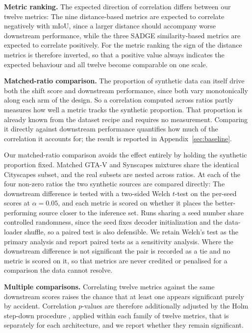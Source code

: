\documentclass[conference]{IEEEtran}
\begin{document}
\textbf{Metric ranking.} The expected direction of correlation differs between our twelve metrics: The nine distance-based metrics are expected to correlate negatively with mIoU, since a larger distance should accompany worse downstream performance, while the three SADGE similarity-based metrics are expected to correlate positively. For the metric ranking the sign of the distance metrics is therefore inverted, so that a positive value always indicates the expected behaviour and all twelve become comparable on one scale.

\textbf{Matched-ratio comparison.} The proportion of synthetic data can itself drive both the shift score and downstream performance, since both vary monotonically along each arm of the design. So a correlation computed across ratios partly measures how well a metric tracks the synthetic proportion. That proportion is already known from the dataset recipe and requires no measurement. Comparing it directly against downstream performance quantifies how much of the correlation it accounts for; the result is reported in Appendix~\ref{sec:baseline}.

Our matched-ratio comparison avoids the effect entirely by holding the synthetic proportion fixed. Matched GTA-V and Synscapes mixtures share the identical Cityscapes subset, and the real subsets are nested across ratios. At each of the four non-zero ratios the two synthetic sources are compared directly: The downstream difference is tested with a two-sided Welch $t$-test on the per-seed scores at $\alpha = 0.05$, and each metric is scored on whether it places the better-performing source closer to the inference set. Runs sharing a seed number share controlled randomness, since the seed fixes decoder initialization and the data-loader shuffle, so a paired test is also defensible. We retain Welch's test as the primary analysis and report paired tests as a sensitivity analysis. Where the downstream difference is not significant the pair is recorded as a tie and no metric is scored on it, so that metrics are never credited or penalised for a comparison the data cannot resolve.

\textbf{Multiple comparisons.} Correlating twelve metrics against the same downstream scores raises the chance that at least one appears significant purely by accident. Correlation $p$-values are therefore additionally adjusted by the Holm step-down procedure \cite{holm1979}, applied within each family of twelve metrics, that is separately for each architecture, and we report whether they remain significant.
\end{document}

